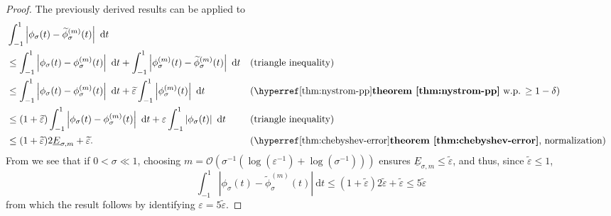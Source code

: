 \documentclass[12pt]{article}
\begin{document}
\begin{proof}
    The previously derived results can be applied to
    \begin{align}
        &\int_{-1}^{1} \left| \phi_{\sigma}(t) - \widetilde{\phi}_{\sigma}^{(m)}(t) \right|~\mathrm{d}t \notag \\
        &\leq \int_{-1}^{1} \left| \phi_{\sigma}(t) - \phi_{\sigma}^{(m)}(t) \right|~\mathrm{d}t + \int_{-1}^{1} \left| \phi^{(m)}_{\sigma}(t) - \widetilde{\phi}_{\sigma}^{(m)}(t) \right|~\mathrm{d}t && \text{(triangle inequality)} \notag \\
        &\leq \int_{-1}^{1} \left| \phi_{\sigma}(t) - \phi_{\sigma}^{(m)}(t) \right|~\mathrm{d}t + \widetilde{\varepsilon} \int_{-1}^{1} \left| \phi^{(m)}_{\sigma}(t) \right|~\mathrm{d}t && \text{(\refthm{thm:nystrom-pp} w.p. $\geq 1 - \delta$)} \notag \\
        &\leq (1 + \widetilde{\varepsilon}) \int_{-1}^{1} \left| \phi_{\sigma}(t) - \phi_{\sigma}^{(m)}(t) \right|~\mathrm{d}t + \varepsilon \int_{-1}^{1} \left| \phi_{\sigma}(t) \right|~\mathrm{d}t && \text{(triangle inequality)} \notag \\
        &\leq (1 + \widetilde{\varepsilon}) 2 \underline{E}_{\sigma, m} + \widetilde{\varepsilon}. && \text{(\refthm{thm:chebyshev-error}, normalization)} \notag \\
    \end{align}
    From  we see that if $0 < \sigma \ll 1$, choosing $m = \mathcal{O}(\sigma^{-1}(\log(\varepsilon^{-1}) + \log(\sigma^{-1})))$ ensures $\underline{E}_{\sigma, m} \leq \widetilde{\varepsilon}$, and thus, since $\widetilde{\varepsilon} \leq 1$,
    \begin{equation}
        \int_{-1}^{1} \left| \phi_{\sigma}(t) - \widetilde{\phi}_{\sigma}^{(m)}(t) \right|~\mathrm{d}t \leq (1+\widetilde{\varepsilon}) 2 \widetilde{\varepsilon} + \widetilde{\varepsilon} \leq 5 \widetilde{\varepsilon}
    \end{equation}
    from which the result follows by identifying $\varepsilon = 5 \widetilde{\varepsilon}$.
\end{proof}


\end{document}
